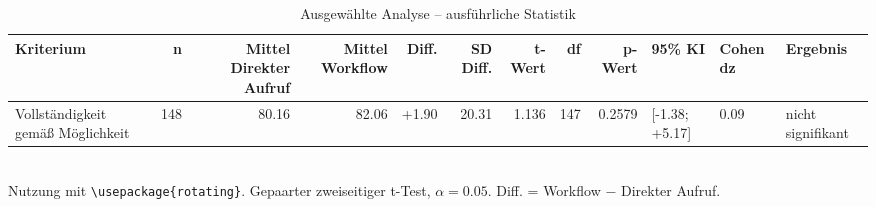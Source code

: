 \begin{table}
\centering
\caption{Ausgewählte Analyse -- ausführliche Statistik}
\begin{tabular}{lrrrrrrrrlll}
\toprule
Kriterium & n & Mittel Direkter Aufruf & Mittel Workflow & Diff. & SD Diff. & t-Wert & df & p-Wert & 95\% KI & Cohen dz & Ergebnis \\
\midrule
Vollständigkeit gemäß Möglichkeit & 148 & 80.16 & 82.06 & +1.90 & 20.31 & 1.136 & 147 & 0.2579 & [-1.38; +5.17] & 0.09 & nicht signifikant \\
\bottomrule
\end{tabular}
\\[2mm]
\footnotesize Nutzung mit \texttt{\textbackslash usepackage\{rotating\}}. Gepaarter zweiseitiger t-Test, $\alpha=0.05$. Diff. = Workflow $-$ Direkter Aufruf.
\end{table}
